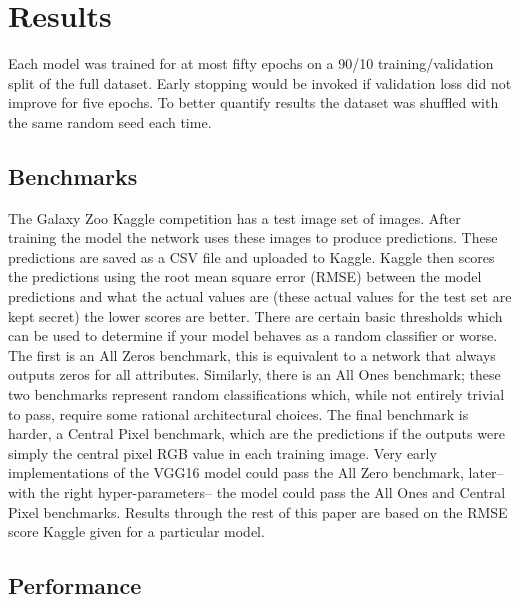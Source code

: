 \section{Results}



Each model was trained for at most fifty epochs on a 90/10 training/validation split of the full dataset. Early stopping would be invoked if validation loss did not improve for five epochs. To better quantify results the dataset was shuffled with the same random seed each time.

\subsection{Benchmarks}
The Galaxy Zoo Kaggle competition has a test image set of  images. After training the model the network uses these images to produce predictions. These predictions are saved as a CSV file and uploaded to Kaggle. Kaggle then scores the predictions using the root mean square error (RMSE) between the model predictions and what the actual values are (these actual values for the test set are kept secret) the lower scores are better. There are certain basic thresholds which can be used to determine if your model behaves as a random classifier or worse. The first is an All Zeros benchmark, this is equivalent to a network that always outputs zeros for all attributes. Similarly, there is an All Ones benchmark; these two benchmarks represent random classifications which, while not entirely trivial to pass, require some rational architectural choices. The final benchmark is harder, a Central Pixel benchmark, which are the predictions if the outputs were simply the central pixel RGB value in each training image. Very early implementations of the VGG16 model could pass the All Zero benchmark, later--with the right hyper-parameters-- the model could pass the All Ones and Central Pixel benchmarks. Results through the rest of this paper are based on the RMSE score Kaggle given for a particular model.

\subsection{Performance}

